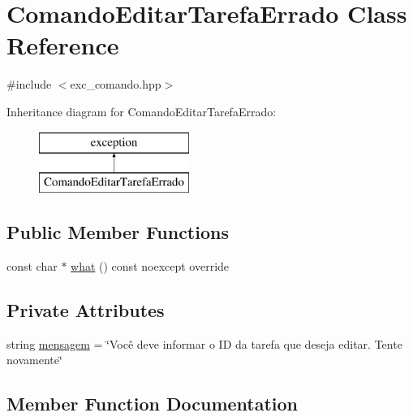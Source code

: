 \hypertarget{classComandoEditarTarefaErrado}{}\section{Comando\+Editar\+Tarefa\+Errado Class Reference}
\label{classComandoEditarTarefaErrado}


{\ttfamily \#include $<$exc\+\_\+comando.\+hpp$>$}

Inheritance diagram for Comando\+Editar\+Tarefa\+Errado\+:\begin{figure}[H]
\begin{center}
\leavevmode
\includegraphics[height=2.000000cm]{classComandoEditarTarefaErrado}
\end{center}
\end{figure}
\subsection*{Public Member Functions}
\begin{DoxyCompactItemize}
\item 
const char $\ast$ \hyperlink{classComandoEditarTarefaErrado_aed17d6c56aea0b46eb88cff12ee5e25e}{what} () const noexcept override
\end{DoxyCompactItemize}
\subsection*{Private Attributes}
\begin{DoxyCompactItemize}
\item 
string \hyperlink{classComandoEditarTarefaErrado_a52e77fe112f01f71de548189720132c9}{mensagem} = \char`\"{}Você deve informar o ID da tarefa que deseja editar. Tente novamente\char`\"{}
\end{DoxyCompactItemize}


\subsection{Member Function Documentation}
\mbox{\label{classComandoEditarTarefaErrado_aed17d6c56aea0b46eb88cff12ee5e25e}} 
